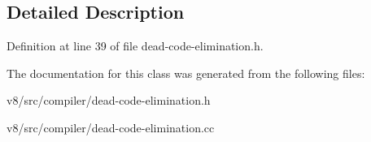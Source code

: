 \subsection{Detailed Description}


Definition at line 39 of file dead-\/code-\/elimination.\+h.



The documentation for this class was generated from the following files\+:\begin{DoxyCompactItemize}
\item 
v8/src/compiler/dead-\/code-\/elimination.\+h\item 
v8/src/compiler/dead-\/code-\/elimination.\+cc\end{DoxyCompactItemize}
